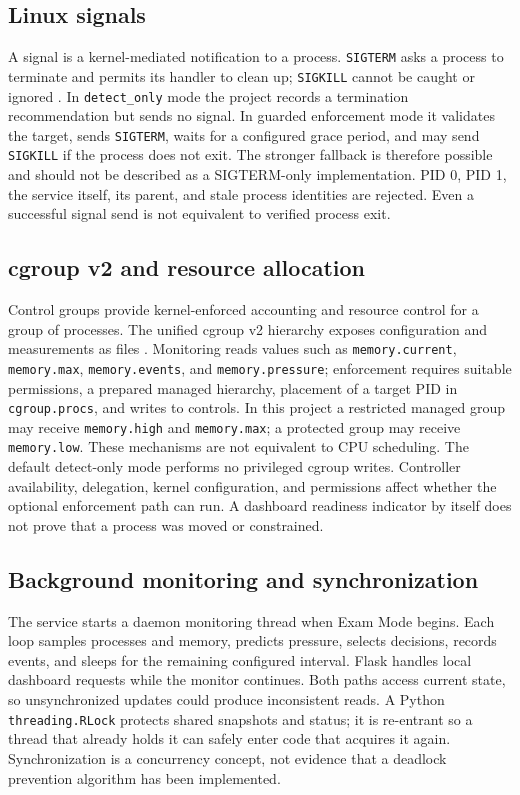 \documentclass[12pt,a4paper]{article}
\newcommand{\code}[1]{\texttt{#1}}
\begin{document}
\subsection{Linux signals}
A signal is a kernel-mediated notification to a process. \code{SIGTERM} asks a process to terminate and permits its handler to clean up; \code{SIGKILL} cannot be caught or ignored \cite{signal-man}. In \code{detect\_only} mode the project records a termination recommendation but sends no signal. In guarded enforcement mode it validates the target, sends \code{SIGTERM}, waits for a configured grace period, and may send \code{SIGKILL} if the process does not exit. The stronger fallback is therefore possible and should not be described as a SIGTERM-only implementation. PID 0, PID 1, the service itself, its parent, and stale process identities are rejected. Even a successful signal send is not equivalent to verified process exit.

\subsection{cgroup v2 and resource allocation}
Control groups provide kernel-enforced accounting and resource control for a group of processes. The unified cgroup v2 hierarchy exposes configuration and measurements as files \cite{cgroup-doc}. Monitoring reads values such as \code{memory.current}, \code{memory.max}, \code{memory.events}, and \code{memory.pressure}; enforcement requires suitable permissions, a prepared managed hierarchy, placement of a target PID in \code{cgroup.procs}, and writes to controls. In this project a restricted managed group may receive \code{memory.high} and \code{memory.max}; a protected group may receive \code{memory.low}. These mechanisms are not equivalent to CPU scheduling. The default detect-only mode performs no privileged cgroup writes. Controller availability, delegation, kernel configuration, and permissions affect whether the optional enforcement path can run. A dashboard readiness indicator by itself does not prove that a process was moved or constrained.

\subsection{Background monitoring and synchronization}
The service starts a daemon monitoring thread when Exam Mode begins. Each loop samples processes and memory, predicts pressure, selects decisions, records events, and sleeps for the remaining configured interval. Flask handles local dashboard requests while the monitor continues. Both paths access current state, so unsynchronized updates could produce inconsistent reads. A Python \code{threading.RLock} protects shared snapshots and status; it is re-entrant so a thread that already holds it can safely enter code that acquires it again. Synchronization is a concurrency concept, not evidence that a deadlock prevention algorithm has been implemented.
\end{document}
